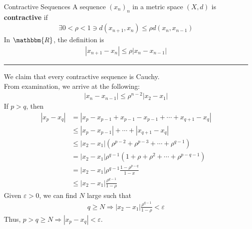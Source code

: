 \documentclass[10pt]{extarticle}
\newcommand{\R}{\mathbbm{R}}
\begin{document}
  \begin{problem}{Contractive Sequences}
    A sequence $(x_n)_n$ in a metric space $(X,d)$ is \textbf{contractive} if
    \begin{align*}
      \exists 0 < \rho < 1 \ni d(x_{n+1},x_n) \leq \rho d(x_{n},x_{n-1}) \tag*{$\forall n\geq 1$}
    \end{align*}
    In $\R$, the definition is
    \begin{align*}
      |x_{n+1}-x_n| \leq \rho |x_n - x_{n-1}|
    \end{align*}
    \vspace{4pt}
    \rule{\textwidth}{0.4pt}
    \vspace{4pt}
    We claim that every contractive sequence is Cauchy.\\

    From examination, we arrive at the following:
    \begin{align*}
      |x_{n} - x_{n-1}| \leq \rho^{n-2}|x_{2}-x_{1}| \tag*{($\ast$)}
    \end{align*}
    If $p > q$, then
    \begin{align*}
      |x_{p}-x_{q}| &= |x_{p}-x_{p-1} + x_{p-1}-x_{p-1} + \cdots + x_{q+1}-x_q|\\
                    &\leq |x_p-x_{p-1}| + \cdots + |x_{q+1}-x_q|\tag*{Triangle Inequality}\\
                    &\leq |x_2-x_1| \left(\rho^{p-2} + \rho^{p-3} + \cdots + \rho^{q-1}\right)\\
                    &= |x_2-x_1| \rho^{q-1} \left(1 + \rho + \rho^2 + \cdots + \rho^{p-q-1}\right)\\
                    &= |x_2-x_1|\rho^{q-1}\frac{1-\rho^{p-q}}{1-x}\tag*{Finite Geometric Sequence}\\
                    &\leq |x_2 - x_1| \frac{\rho^{q-1}}{1-\rho}
    \end{align*}
    Given $\varepsilon > 0$, we can find $N$ large such that 
    \begin{align*}
      q\geq N \Rightarrow |x_2-x_1| \frac{\rho^{q-1}}{1-\rho} < \varepsilon
    \end{align*}
    Thus, $p > q \geq N \Rightarrow |x_p-x_q| < \varepsilon$.
  \end{problem}
\end{document}
